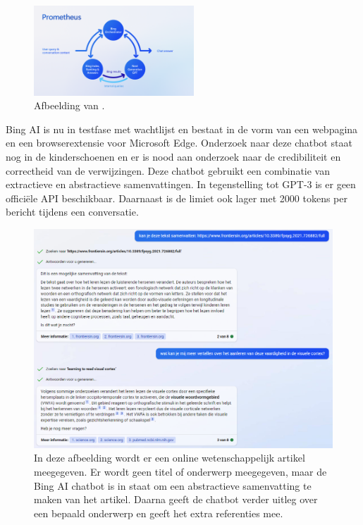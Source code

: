 \begin{figure}[H]
	\includegraphics[width=6cm]{img/bing-ai-prometheus.png}
	\caption{Afbeelding van \textcite{Ribas2023}.}
\end{figure}

Bing AI is nu in testfase met wachtlijst en bestaat in de vorm van een webpagina en een browserextensie voor Microsoft Edge. Onderzoek naar deze chatbot staat nog in de kinderschoenen en er is nood aan onderzoek naar de credibiliteit en correctheid van de verwijzingen. Deze chatbot gebruikt een combinatie van extractieve en abstractieve samenvattingen. In tegenstelling tot GPT-3 is er geen officiële API beschikbaar. Daarnaast is de limiet ook lager met 2000 tokens per bericht tijdens een conversatie. 

\begin{figure}[H]
	\includegraphics{img/bing-ai-chatbot-example.png}
	\caption{In deze afbeelding wordt er een online wetenschappelijk artikel meegegeven. Er wordt geen titel of onderwerp meegegeven, maar de Bing AI chatbot is in staat om een abstractieve samenvatting te maken van het artikel. Daarna geeft de chatbot verder uitleg over een bepaald onderwerp en geeft het extra referenties mee.}
\end{figure}


